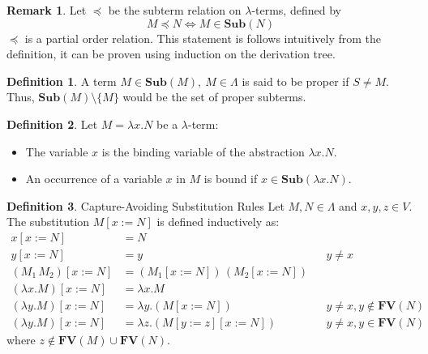 \documentclass[12pt]{book}
\newcommand{\la}{\lambda}
\newcommand{\La}{\Lambda}
\newcommand{\Vset}{V}
\newcommand{\lterm}{$\la$-term}
\newcommand{\lterms}{$\la$-terms}
\newcommand{\functionfont}[1]{\mathbf{#1}}
\newcommand{\Sub}[1]{\functionfont{Sub}(#1)}
\newcommand{\FV}[1]{\functionfont{FV}(#1)}
\theoremstyle{plain}
\theoremstyle{definition}
\newtheorem{definition}{Definition}[section]
\theoremstyle{definition}
\theoremstyle{definition}
\newtheorem*{remark}{Remark}
\begin{document}
\begin{remark}
  Let \( \preceq \) be the subterm relation on \lterms, defined by
  \[
    M \preceq N \iff M \in \Sub{ N }
  \]
  \( \preceq \) is a partial order relation. This statement is follows intuitively from the definition, it can be proven using induction on the derivation tree.
\end{remark}
\begin{definition} A term $M \in \Sub M, \ M \in \Lambda$ is said to be proper if $S \neq M$. Thus, $\Sub{M} \setminus \{M\}$ would be the set of proper subterms.
\end{definition}
\begin{definition} Let \( M = \lambda x. N \) be a \lterm:
\begin{itemize}
\item The variable \( x \) is the binding variable of the abstraction \( \lambda x. N \).
  \item An occurrence of a variable \( x \) in \( M \) is bound if \( x \in \Sub { \lambda x. N } \).
  \end{itemize}
\end{definition}

\begin{definition}Capture-Avoiding Substitution Rules
  Let \( M, N \in \La \) and \( x, y, z \in \Vset \). The substitution \( M[x := N] \) is defined inductively as:
  \[
    \begin{aligned}
      x[x := N]                       & = N \\
      y[x := N]                       & = y && y \neq x \\
      (M_1\, M_2)[x := N]             & = (M_1[x := N])\,(M_2[x := N]) \\
      (\lambda x. M)[x := N]          & = \lambda x. M \\
      (\lambda y. M)[x := N]          & = \lambda y. (M[x := N]) && y \neq x, y \notin \FV { N } \\
      (\lambda y. M)[x := N]          & = \lambda z. (M[y := z][x := N]) && y \neq x, y \in \FV { N }
    \end{aligned}
  \]
  where \( z \notin \FV { M } \cup \FV { N } \).
\end{definition}
\end{document}
